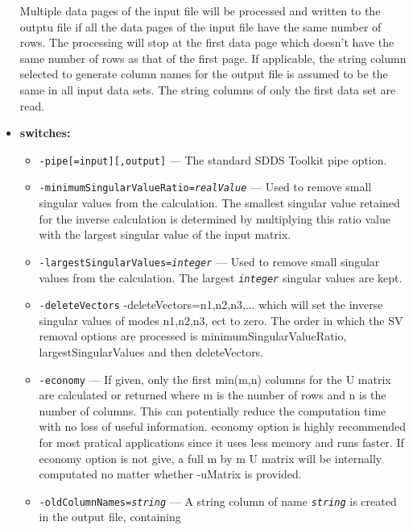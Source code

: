 \begin{itemize}
Multiple data pages of the input file will be processed and written to the
outptu file if all the data pages of the input file
have the same number of rows.
The processing will stop at the first data page
which doesn't have the same number of rows as that of the first page.
If applicable, the string column selected to generate column names for the
output file is assumed to be the same in all input data sets. The
string columns of only the first data set are read.
\item {\bf switches:}
%
%
    \begin{itemize}
%
%
    \item {\tt  -pipe[=input][,output]} --- The standard SDDS Toolkit pipe option.
    \item {\tt  -minimumSingularValueRatio={\em realValue}} ---  Used to remove
        small singular values from the calculation. The smallest singular value retained
        for the inverse calculation
        is determined by multiplying this ratio value with the largest singular
        value of the input matrix.
    \item {\tt  -largestSingularValues={\em integer}} ---  Used to remove
        small singular values from the calculation. The largest 
        {\tt {\em integer}} singular values are kept.
    \item {\tt -deleteVectors}  -deleteVectors=n1,n2,n3,... which will set the inverse singular values 
                  of modes n1,n2,n3, ect to zero. 
               The order in which the SV removal options are processed is 
               minimumSingularValueRatio, largestSingularValues and then deleteVectors.
    \item {\tt -economy} --- If given,  only the first min(m,n) columns for the U matrix are calculated or returned 
               where m is the number of rows and n is the number of columns. This 
               can potentially reduce the computation time with no loss of useful information.
               economy option is highly recommended for most pratical applications since it uses
               less memory and runs faster. If economy option is not give, a full m by m U matrix 
               will be internally computated no matter whether -uMatrix is provided. 
    \item {\tt  -oldColumnNames={\em string}} --- 
        A string column  of name {\tt {\em string}} is created in the output file, containing

\end{itemize}
\end{itemize}
